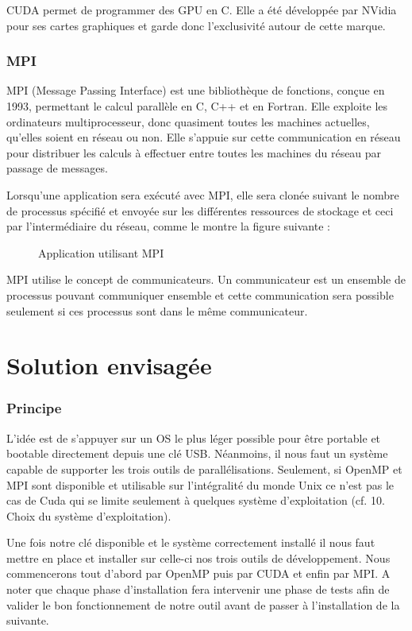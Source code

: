 \documentclass[final]{polytech/polytech}
\begin{document}
CUDA permet de programmer des GPU en C. Elle a été développée par NVidia pour ses cartes graphiques et garde donc l’exclusivité autour de cette marque.

\section{MPI}
MPI (Message Passing Interface) est une bibliothèque de fonctions, conçue en 1993, permettant le calcul parallèle en C, C++ et en Fortran. Elle exploite les ordinateurs multiprocesseur, donc quasiment toutes les machines actuelles, qu'elles soient en réseau ou non. Elle s'appuie sur cette communication en réseau pour distribuer les calculs à effectuer entre toutes les machines du réseau par passage de messages.

Lorsqu'une application sera exécuté avec MPI, elle sera clonée suivant le nombre de processus spécifié et envoyée sur les différentes ressources de stockage et ceci par l'intermédiaire du réseau, comme le montre la figure suivante :

\begin{figure}
	\caption{Application utilisant MPI}
	\label{fig:mpi_app}
\end{figure}

MPI utilise le concept de communicateurs. Un communicateur est un ensemble de processus pouvant communiquer ensemble et cette communication sera possible seulement si ces processus sont dans le même communicateur.

\part{Solution envisagée}

\section{Principe}
L’idée est de s’appuyer sur un OS le plus léger possible pour être portable et bootable directement depuis une clé USB. Néanmoins, il nous faut un système capable de supporter les trois outils de parallélisations. Seulement, si OpenMP et MPI sont disponible et utilisable sur l’intégralité du monde Unix ce n’est pas le cas de Cuda qui se limite seulement à quelques système d’exploitation (cf. 10. Choix du système d’exploitation).

Une fois notre clé disponible et le système correctement installé il nous faut mettre en place et installer sur celle-ci nos trois outils de développement.  Nous commencerons tout d’abord par OpenMP puis par CUDA et enfin par MPI. A noter que chaque phase d’installation fera intervenir une phase de tests afin de valider le bon fonctionnement de notre outil avant de passer à l’installation de la suivante.
\end{document}
